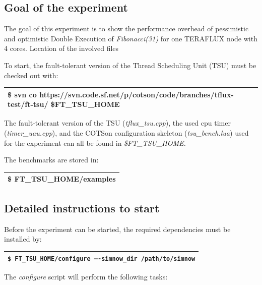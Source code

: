 \documentclass[a4paper]{article}
\begin{document}
\subsection[Goal of the experiment ]{Goal of the experiment }
{
The goal of this experiment is to show the performance overhead of
pessimistic and optimistic Double Execution of \textit{Fibonacci(31)}
for one TERAFLUX node with 4 cores. Location of the involved files }

{
To start, the fault-tolerant version of the Thread Scheduling Unit (TSU)
must be checked out with:}

\begin{flushleft}
\tablehead{}
\begin{supertabular}{|m{6.29346in}|}
\hline
{}\ttfamily \$ svn co
https://svn.code.sf.net/p/cotson/code/branches/tflux-test/ft-tsu/
\$FT\_TSU\_HOME\\\hline
\end{supertabular}
\end{flushleft}
{
The fault-tolerant version of the TSU (\textit{tflux\_tsu.cpp}), the
used cpu timer (\textit{timer\_uau.cpp}), and the COTSon configuration
skeleton (\textit{tsu\_bench.lua}) used for the experiment can all be
found in \textit{\$FT\_TSU\_HOME.}}

{
The benchmarks are stored in:}

\begin{flushleft}
\tablehead{}
\begin{supertabular}{|m{6.29346in}|}
\hline
{}\ttfamily \$ FT\_TSU\_HOME/examples\\\hline
\end{supertabular}
\end{flushleft}
\subsection[Detailed instructions to start ]{Detailed instructions to
start }
{
Before the experiment can be started, the required dependencies must be
installed by:}

\begin{flushleft}
\tablehead{}
\begin{supertabular}{|m{6.29346in}|}
\hline
{} \texttt{\$ FT\_TSU\_HOME/configure
--{}-simnow\_dir /path/to/simnow}\\\hline
\end{supertabular}
\end{flushleft}
{
The \textit{configure} script will perform the following tasks:}
\end{document}
